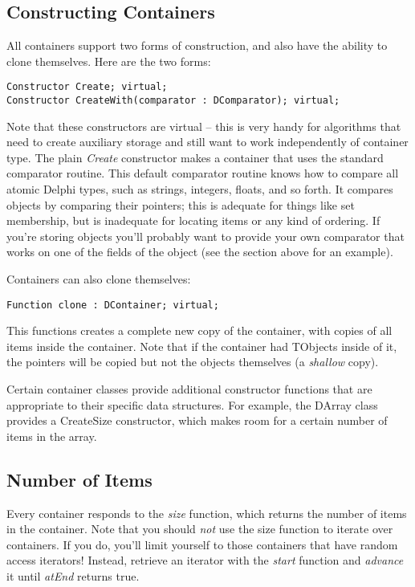\documentclass{report}
\begin{document}
\subsection{Constructing Containers}

All containers support two forms of construction, and 
also have the ability to clone themselves. Here are the two forms:

\begin{lstlisting}
Constructor Create; virtual;
Constructor CreateWith(comparator : DComparator); virtual;
\end{lstlisting}

Note that these constructors are virtual -- this is very handy for
algorithms that need to create auxiliary storage and still want to work
independently of container type. The plain \emph{Create} constructor makes a
container that uses the standard comparator routine. This default comparator
routine knows how to compare all atomic Delphi types, such as strings,
integers, floats, and so forth. It compares objects by comparing their
pointers; this is adequate for things like set membership, but is inadequate
for locating items or any kind of ordering. If you're storing objects you'll
probably want to provide your own comparator that works on one of the fields
of the object (see the section above for an example).

Containers can also clone themselves:

\begin{lstlisting}
Function clone : DContainer; virtual;
\end{lstlisting}

This functions creates a complete new copy of the container, with copies of
all items inside the container. Note that if the container had TObjects
inside of it, the pointers will be copied but not the objects themselves (a
\emph{shallow} copy).

Certain container classes provide additional constructor functions that are
appropriate to their specific data structures. For example, the DArray class
provides a CreateSize constructor, which makes room for a certain number of
items in the array.

\subsection{Number of Items}

Every container responds to the \emph{size} function, which returns the
number of items in the container. Note that you should \emph{not} use the
size function to iterate over containers. If you do, you'll limit yourself
to those containers that have random access iterators! Instead, retrieve an
iterator with the \emph{start} function and \emph{advance} it until
\emph{atEnd} returns true.
\end{document}
